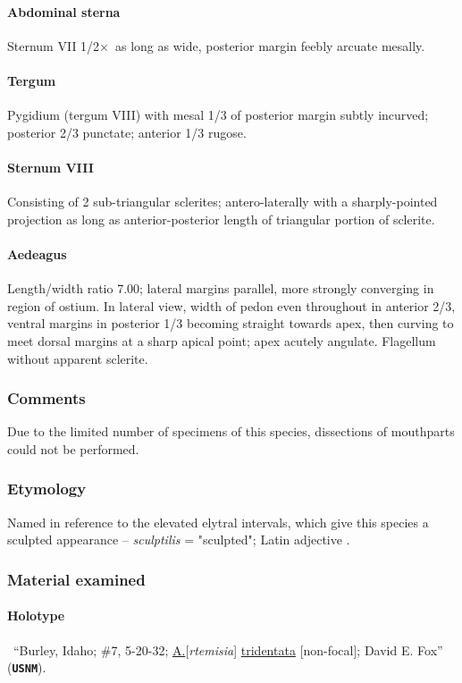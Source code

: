 \documentclass[fleqn,10pt,lineno]{wlpeerj} %
\newcommand{\x}{$\times$~}
\begin{document}
			\paragraph{Abdominal sterna}
				Sternum VII 1/2\x as long as wide, posterior margin feebly arcuate mesally.
			\paragraph{Tergum}
				Pygidium (tergum VIII) with mesal 1/3 of posterior margin subtly incurved; posterior 2/3 punctate; anterior 1/3 rugose.
			\paragraph{Sternum VIII}
				Consisting of 2 sub-triangular sclerites; antero-laterally with a sharply-pointed projection as long as anterior-posterior length of triangular portion of sclerite.
			\paragraph{Aedeagus}
				Length/width ratio 7.00; lateral margins parallel, more strongly converging in region of ostium. 
				In lateral view, width of pedon even throughout in anterior 2/3, ventral margins in posterior 1/3 becoming straight towards apex, then curving to meet dorsal margins at a sharp apical point; apex acutely angulate. 
				Flagellum without apparent sclerite.
		\subsubsection*{Comments}
			Due to the limited number of specimens of this species, dissections of mouthparts could not be performed.
		\subsubsection*{Etymology}
			Named in reference to the elevated elytral intervals, which give this species a sculpted appearance -- \textit{sculptilis} = "sculpted"; Latin adjective \citep{brown1956}.
		\subsubsection*{Material examined}
			\paragraph{Holotype}
				\female~``Burley, Idaho; \#7, 5-20-32; \underline{A.}[\textit{rtemisia}] \underline{tridentata} [non-focal]; David E. Fox'' (\texttt{\textbf{USNM}}).
\end{document}
